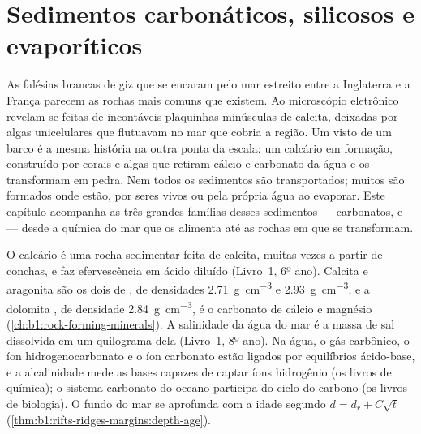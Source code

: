 \chapter{Sedimentos carbonáticos, silicosos e evaporíticos}\label{ch:b1:chemical-biogenic-sediments}

As falésias brancas de giz que se encaram pelo mar estreito entre a Inglaterra e a
França parecem as rochas mais comuns que existem. Ao microscópio eletrônico revelam-se
feitas de incontáveis plaquinhas minúsculas de calcita, deixadas por algas
unicelulares que flutuavam no mar que cobria a região. Um  visto de um barco é a
mesma história na outra ponta da escala: um calcário em formação, construído por corais e
algas que retiram cálcio e carbonato da água e os transformam em pedra. Nem todos os
sedimentos são transportados; muitos são formados onde estão, por seres vivos ou pela
própria água ao evaporar. Este capítulo acompanha as três grandes famílias desses
sedimentos --- carbonatos,  e  --- desde a química do mar que
os alimenta até as rochas em que se transformam.

\begin{recall}
O calcário é uma rocha sedimentar feita de calcita, muitas vezes a partir de conchas, e
faz efervescência em ácido diluído (Livro~1, 6º ano). Calcita e aragonita são os dois
 de , de densidades \qty{2.71}{g.cm^{-3}} e \qty{2.93}{g.cm^{-3}}, e
a dolomita , de densidade \qty{2.84}{g.cm^{-3}}, é o carbonato de cálcio e
magnésio (\cref{ch:b1:rock-forming-minerals}). A salinidade da água do mar é a massa de
sal dissolvida em um quilograma dela (Livro~1, 8º ano). Na água, o gás carbônico, o íon
hidrogenocarbonato e o íon carbonato estão ligados por equilíbrios ácido-base, e a
alcalinidade mede as bases capazes de captar íons hidrogênio (os livros de química); o
sistema carbonato do oceano participa do ciclo do carbono (os livros de biologia). O
fundo do mar se aprofunda com a idade segundo $d = d_r + C\sqrt t$
(\cref{thm:b1:rifts-ridges-margins:depth-age}).
\end{recall}

